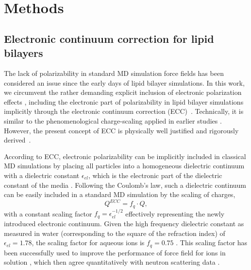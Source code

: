 \documentclass[aip,jcp,twocolumn]{revtex4}
\begin{document}
\section{Methods}

\subsection{Electronic continuum correction for lipid bilayers}\label{section:ecc}
The lack of polarizability in standard MD simulation
force fields has been considered an issue since the early days of
lipid bilayer simulations.
In this work, we circumvent the rather demanding explicit inclusion
of electronic polarization effects \cite{lucas12,chowdhary13},
including the electronic part of polarizability in lipid
bilayer simulations implicitly through 
the electronic continuum correction (ECC)~\cite{leontyev11}. 
Technically, it is similar to the phenomenological charge-scaling applied in 
earlier studies \cite{jonsson86,egberts94}.
However, the present concept of ECC is
physically well justified and rigorously derived~\cite{leontyev09, leontyev10, leontyev11, leontyev14}.


According to ECC, electronic
polarizability can be implicitly included in classical MD simulations by
placing all particles into a homogeneous dielectric continuum 
with a dielectric constant $\epsilon _{el}$, 
which is the electronic part of the dielectric constant of 
the media \cite{leontyev11}. 
Following the Coulomb's law, such a dielectric continuum can be 
easily included in a standard MD simulation by
the scaling of charges,
\begin{equation}
  Q^{ECC} = f_q \cdot Q ,
\end{equation}
with a constant scaling factor $f_q = \epsilon _{el} ^{-1/2}$ 
effectively representing the newly introduced electronic continuum. 
Given the  high frequency dielectric constant as measured in water (corresponding to the square of the refraction index) of  $\epsilon _{el} = 1.78$,  
the scaling factor for aqueous ions is $f_q = 0.75$ \cite{some_orig_source, leontyev11}. This scaling factor has been
successfully used to improve the performance of force field for ions in solution \cite{kohagen14,kohagen16,??},
which then agree quantitatively with neutron scattering data \cite{kohagen14,kohagen16, Pluharova2014}. 
\end{document}
